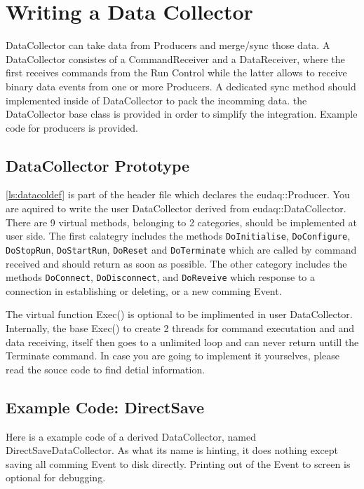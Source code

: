 \section{Writing a Data Collector}\label{sec:DataCollectorWriting}
DataCollector can take data from Producers and merge/sync those data.
A DataCollector consistes of a CommandReceiver and a DataReceiver, where the first receives commands from the Run Control while the latter allows to receive binary data events from one or more Producers. A dedicated sync method should implemented inside of DataCollector to pack the incomming data.
the DataCollector base class is provided in order to simplify the integration. Example code for producers is provided.

\subsection{DataCollector Prototype}\label{sec:datacollector_hh}

\autoref{ls:datacoldef} is part of the header file which declares the eudaq::Producer. You are aquired to write the user DataCollector derived from eudaq::DataCollector.
There are 9 virtual methods, belonging to 2 categories, should be implemented at user side. The first calategry includes the methods \lstinline[style=cpp]{DoInitialise},
\lstinline[style=cpp]{DoConfigure}, \lstinline[style=cpp]{DoStopRun}, \lstinline[style=cpp]{DoStartRun}, \lstinline[style=cpp]{DoReset} and \lstinline[style=cpp]{DoTerminate} which are called by command received and should return as soon as possible. The other category includes the methods \lstinline[style=cpp]{DoConnect}, \lstinline[style=cpp]{DoDisconnect}, and \lstinline[style=cpp]{DoReveive} which response to a connection in establishing or deleting, or a new comming Event.



The virtual function Exec() is optional to be implimented in user DataCollector. Internally, the base Exec() to create 2 threads for command executation and and data receiving,  itself then goes to a unlimited loop and can never return untill the Terminate command. In case you are going to implement it yourselves, please read the souce code to find detial information.

\subsection{Example Code: DirectSave}\label{sec:directsavedatacollector_cc}
Here is a example code of a derived DataCollector, named DirectSaveDataCollector. As what its name is hinting,  it does nothing except saving all comming Event to disk directly. Printing out of the Event to screen is optional for debugging.


